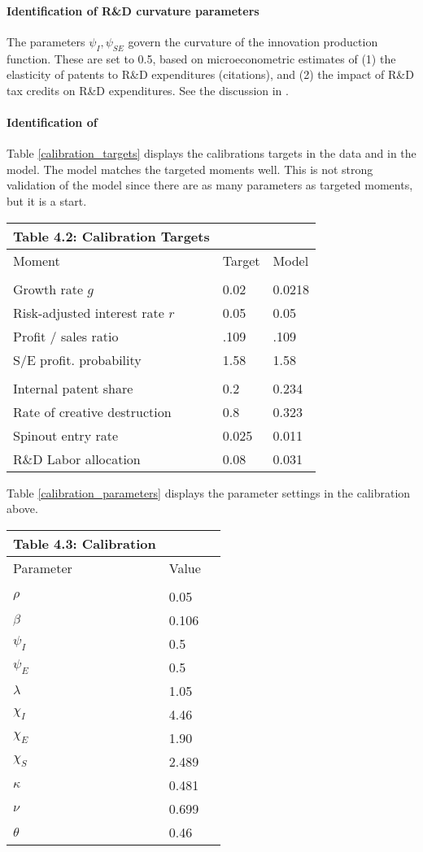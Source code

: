 \documentclass[11pt,english]{article}
\theoremstyle{remark}
\begin{document}
\paragraph{Identification of R\&D curvature parameters}

The parameters $\psi_I, \psi_{SE}$ govern the curvature of the innovation production function. These are set to 0.5, based on microeconometric estimates of (1) the elasticity of patents to R\&D expenditures (citations), and (2) the impact of R\&D tax credits on R\&D expenditures. See the discussion in \cite{akcigit_growth_2018}.

\paragraph{Identification of }

Table \ref{calibration_targets} displays the calibrations targets in the data and in the model. The model matches the targeted moments well. This is not strong validation of the model since there are as many parameters as targeted moments, but it is a start. 


\begin{center}
	\begin{tabular}{lll}
		Table 4.2: Calibration Targets &  &  \tabularnewline
		\hline 
		Moment  & Target & Model \tabularnewline
		& \tabularnewline
		\hline 
		Growth rate $g$ & 0.02 & 0.0218 \tabularnewline
		Risk-adjusted interest rate $r$ & 0.05 & 0.05 \tabularnewline
		Profit / sales ratio & .109 & .109 \tabularnewline
		S/E profit. probability & 1.58 & 1.58 \tabularnewline
		\tabularnewline
		Internal patent share & 0.2 & 0.234
		\tabularnewline
		Rate of creative destruction & 0.8 & 0.323
		\tabularnewline
		Spinout entry rate & 0.025 & 0.011
		\tabularnewline
		R\&D Labor allocation & 0.08 & 0.031
	\end{tabular}
	\label{calibration_targets}
\end{center}

Table \ref{calibration_parameters} displays the parameter settings in the calibration above. 

\begin{table*}[h]\label{calibration_parameters}
	\centering
	\begin{tabular}{lll}
	Table 4.3: Calibration &   \tabularnewline
	\hline 
	Parameter & Value\tabularnewline
	\tabularnewline
	\hline 
	$\rho$ & 0.05\tabularnewline
	$\beta$ & 0.106\tabularnewline
	$\psi_I$ & 0.5\tabularnewline
	$\psi_E$ & 0.5\tabularnewline
	$\lambda$ & 1.05\tabularnewline
	$\chi_I$ & 4.46 \tabularnewline
	$\chi_E$ & 1.90 \tabularnewline
	$\chi_S$ & 2.489 \tabularnewline
	$\kappa$ & 0.481 \tabularnewline
	$\nu$ & 0.699 \tabularnewline
	$\theta$ & 0.46
	\end{tabular}
\end{table*}
\end{document}
